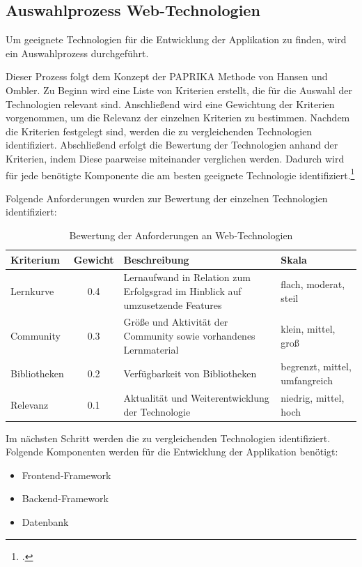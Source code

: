 \clearpage

\subsection{Auswahlprozess Web-Technologien}
Um geeignete Technologien für die Entwicklung der Applikation zu finden, wird ein Auswahlprozess durchgeführt.

Dieser Prozess folgt dem Konzept der PAPRIKA Methode von Hansen und Ombler.
Zu Beginn wird eine Liste von Kriterien erstellt, die für die Auswahl der Technologien relevant sind.
Anschließend wird eine Gewichtung der Kriterien vorgenommen, um die Relevanz der einzelnen Kriterien zu bestimmen.
Nachdem die Kriterien festgelegt sind, werden die zu vergleichenden Technologien identifiziert.
Abschließend erfolgt die Bewertung der Technologien anhand der Kriterien, indem Diese paarweise miteinander verglichen werden.
Dadurch wird für jede benötigte Komponente die am besten geeignete Technologie identifiziert.\footcite{Paprika2008}

Folgende Anforderungen wurden zur Bewertung der einzelnen Technologien identifiziert:

\begin{table}[htbp]
  \centering
  \begin{tabular}{|p{2cm}|c|p{5cm}|p{4cm}|}
      \hline
      \textbf{Kriterium} & \textbf{Gewicht} & \textbf{Beschreibung} & \textbf{Skala}\\ \hline
      {Lernkurve} & 0.4 & Lernaufwand in Relation zum Erfolgsgrad im Hinblick auf umzusetzende Features & flach, moderat, steil\\ \hline
      {Community} & 0.3 & Größe und Aktivität der Community sowie vorhandenes Lernmaterial & klein, mittel, groß\\ \hline
      {Bibliotheken} & 0.2 & Verfügbarkeit von Bibliotheken & begrenzt, mittel, umfangreich\\ \hline
      {Relevanz} & 0.1 & Aktualität und Weiterentwicklung der Technologie & niedrig, mittel, hoch\\ \hline
  \end{tabular}
  \caption{Bewertung der Anforderungen an Web-Technologien}\label{tab:table}
\end{table}

Im nächsten Schritt werden die zu vergleichenden Technologien identifiziert.
Folgende Komponenten werden für die Entwicklung der Applikation benötigt:

\begin{itemize}
  \item Frontend-Framework
  \item Backend-Framework
  \item Datenbank
\end{itemize}

